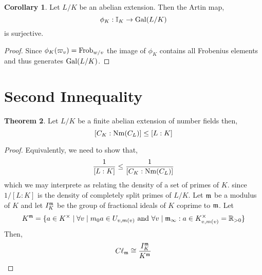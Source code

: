 \documentclass[12pt]{extarticle}
\newcommand{\divides}{\mid}
\newcommand{\R}{\mathbb{R}}
\newcommand{\idele}[1]{\mathbb{I}_{#1}}
\theoremstyle{definition}
\newtheorem{theorem}{Theorem}[section]
\newtheorem{corollary}[theorem]{Corollary}
\begin{document}
\begin{corollary}
Let $L / K$ be an abelian extension. Then the Artin map,
\[ \phi_K : \idele{K} \to \Gal{L/K} \]
is surjective.
\end{corollary}

\begin{proof}
Since $\phi_K(\varpi_v) = \mathrm{Frob}_{w/v}$ the image of $\phi_K$ contains all Frobenius elements and thus generates $\mathrm{Gal} (L/K)$. 
\end{proof}

\section{Second Innequality}

\begin{theorem}
Let $L / K$ be a finite abelian extension of number fields then,
\[ [C_K : \mathrm{Nm}(C_L)] \le [ L : K ] \]
\end{theorem}

\begin{proof}
Equivalently, we need to show that,
\[ \frac{1}{[L : K]} \le \frac{1}{[C_K : \mathrm{Nm}(C_L)]} \]
which we may interprete as relating the density of a set of primes of $K$. since $1/[L : K]$ is the density of completely split primes of $L/K$. Let $\mathfrak{m}$ be a modulus of $K$ and let $I_K^{\mathfrak{m}}$ be the group of fractional ideals of $K$ coprime to $\mathfrak{m}$. Let 
\[ K^\m = \{ a \in K^\times \mid \forall v \divides m_0 a \in U_{v, m(v)} \text{ and } \forall v \divides \m_{\infty} : a \in K_{v, m(v)}^\times = \R_{> 0} \} \]
Then,
\[ C\ell_{\mathfrak{m}} \cong \frac{I_K^{\mathfrak{m}}}{K^{\mathfrak{m}}} \]
\end{proof}
\end{document}
